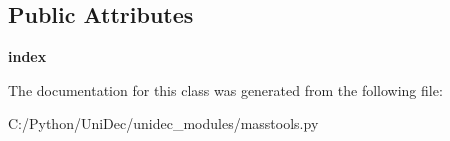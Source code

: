\subsection*{Public Attributes}
\begin{DoxyCompactItemize}
\item 
\hypertarget{class_uni_dec_1_1unidec__modules_1_1masstools_1_1_test_list_ctrl2_ae84b6137bb6b5595ff1c9593d72f3d3a}{}{\bfseries index}\label{class_uni_dec_1_1unidec__modules_1_1masstools_1_1_test_list_ctrl2_ae84b6137bb6b5595ff1c9593d72f3d3a}

\end{DoxyCompactItemize}


The documentation for this class was generated from the following file\+:\begin{DoxyCompactItemize}
\item 
C\+:/\+Python/\+Uni\+Dec/unidec\+\_\+modules/masstools.\+py\end{DoxyCompactItemize}
